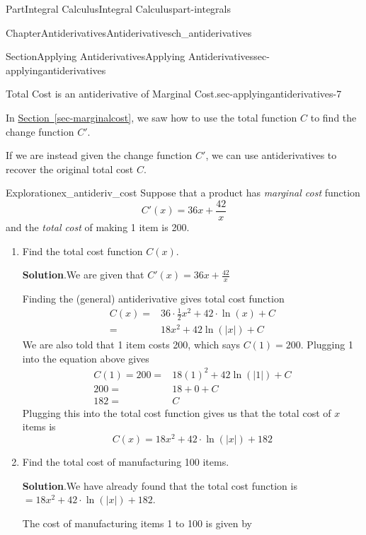 \documentclass{tufte-book}
\newcommand{\blocktitlefont}{\relax}
\newcommand{\xreffont}{\relax}
\numberwithin{equation}{chapter}
\newcommand{\amp}{&}
\begin{document}
\begin{partptx}{Part}{Integral Calculus}{}{Integral Calculus}{}{}{part-integrals}
\begin{chapterptx}{Chapter}{Antiderivatives}{}{Antiderivatives}{}{}{ch_antiderivatives}
\begin{sectionptx}{Section}{Applying Antiderivatives}{}{Applying Antiderivatives}{}{}{sec-applyingantiderivatives}
\begin{paragraphs}{Total Cost is an antiderivative of Marginal Cost.}{sec-applyingantiderivatives-7}
\par
In \hyperref[sec-marginalcost]{Section~{\xreffont\ref{sec-marginalcost}}}, we saw how to use the total function \(C\) to find the change function \(C'\).%
\par
If we are instead given the change function \(C'\), we can use antiderivatives to recover the original total cost \(C\).%
\end{paragraphs}%
\begin{exploration}{Exploration}{}{ex_antideriv_cost}%
Suppose that a product has \emph{marginal cost} function%
\begin{equation*}
C'(x) = 36x + \frac{42}{x}
\end{equation*}
and the \emph{total cost} of making 1 item is \textdollar{}200.%
\begin{enumerate}[font=\bfseries,label=(\alph*),ref=\alph*]%
\item{}Find the total cost function \(C(x)\).%
\par\smallskip%
\noindent\textbf{\blocktitlefont Solution}.\hypertarget{ex_antideriv_cost-2-2}{}\quad{}We are given that \(C'(x) = 36x + \frac{42}{x} \)%
\par
Finding the (general) antiderivative gives total cost function%
\begin{align*}
C(x) = \amp 36\cdot \frac{1}{2}x^2 + 42\cdot \ln(x) + C\\
= \amp 18 x^2 + 42\ln(|x|) + C
\end{align*}
We are also told that 1 item costs \textdollar{}200, which says \(C(1) = 200\).  Plugging 1 into the equation above gives%
\begin{align*}
C(1) = 200 = \amp 18(1)^2 + 42\ln(|1|) + C \\
200 = \amp 18 + 0 + C \\
182 = \amp C 
\end{align*}
Plugging this into the total cost function gives us that the total cost of \(x\) items is%
\begin{equation*}
C(x) = 18x^2 + 42\cdot \ln(|x|) + 182
\end{equation*}
%
\item{}Find the total cost of manufacturing 100 items.%
\par\smallskip%
\noindent\textbf{\blocktitlefont Solution}.\hypertarget{ex_antideriv_cost-3-2}{}\quad{}We have already found that the total cost function is \(= 18x^2 + 42\cdot \ln(|x|) + 182\).%
\par
The cost of manufacturing items 1 to 100 is given by%
\begin{equation*}

\end{equation*}
\end{enumerate}
\end{exploration}
\end{sectionptx}
\end{chapterptx}
\end{partptx}
\end{document}

